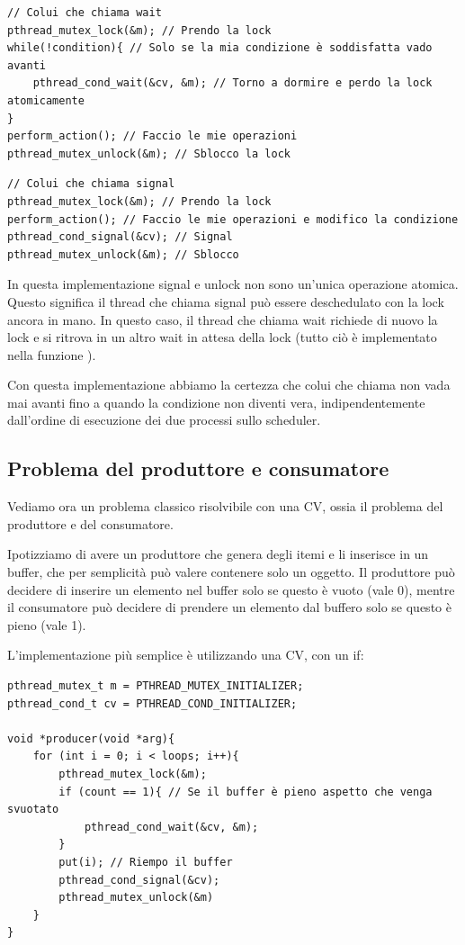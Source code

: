 \documentclass[11pt, a4paper, titlepage, oneside]{scrbook}
\begin{document}
\begin{lstlisting}[style=C]
// Colui che chiama wait
pthread_mutex_lock(&m); // Prendo la lock
while(!condition){ // Solo se la mia condizione è soddisfatta vado avanti
    pthread_cond_wait(&cv, &m); // Torno a dormire e perdo la lock atomicamente
}
perform_action(); // Faccio le mie operazioni
pthread_mutex_unlock(&m); // Sblocco la lock
\end{lstlisting}

\begin{lstlisting}[style=C]
// Colui che chiama signal
pthread_mutex_lock(&m); // Prendo la lock
perform_action(); // Faccio le mie operazioni e modifico la condizione
pthread_cond_signal(&cv); // Signal
pthread_mutex_unlock(&m); // Sblocco
\end{lstlisting}

\NB In questa implementazione signal e unlock non sono un'unica operazione atomica. Questo significa il thread che chiama signal può essere deschedulato con la lock ancora in mano. In questo caso, il thread che chiama wait richiede di nuovo la lock e si ritrova in un altro wait in attesa della lock (tutto ciò è implementato nella funzione ).

Con questa implementazione abbiamo la certezza che colui che chiama  non vada mai avanti fino a quando la condizione non diventi vera, indipendentemente dall'ordine di esecuzione dei due processi sullo scheduler.

\subsection{Problema del produttore e consumatore}

Vediamo ora un problema classico risolvibile con una CV, ossia il problema del produttore e del consumatore.

Ipotizziamo di avere un produttore che genera degli itemi e li inserisce in un buffer, che per semplicità può valere contenere solo un oggetto. Il produttore può decidere di inserire un elemento nel buffer solo se questo è vuoto (vale 0), mentre il consumatore può decidere di prendere un elemento dal buffero solo se questo è pieno (vale 1).

L'implementazione più semplice è utilizzando una CV, con un if:

\begin{lstlisting}[style=C]
pthread_mutex_t m = PTHREAD_MUTEX_INITIALIZER;
pthread_cond_t cv = PTHREAD_COND_INITIALIZER;

void *producer(void *arg){
    for (int i = 0; i < loops; i++){
        pthread_mutex_lock(&m);
        if (count == 1){ // Se il buffer è pieno aspetto che venga svuotato
            pthread_cond_wait(&cv, &m);
        }
        put(i); // Riempo il buffer
        pthread_cond_signal(&cv);
        pthread_mutex_unlock(&m)
    }
}
\end{lstlisting}
\end{document}
